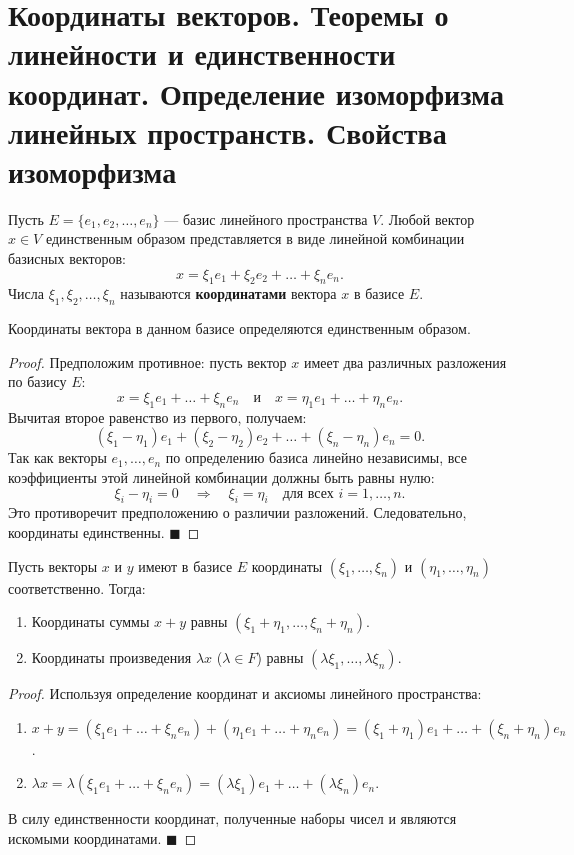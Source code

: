 \section{Координаты векторов. Теоремы о линейности и единственности координат. Определение изоморфизма линейных пространств. Свойства изоморфизма}

\begin{definition}
Пусть $E = \{e_1, e_2, \dots, e_n\}$ --- базис линейного пространства $V$. Любой вектор $x \in V$ единственным образом представляется в виде линейной комбинации базисных векторов:
\[
x = \xi_1 e_1 + \xi_2 e_2 + \dots + \xi_n e_n.
\]
Числа $\xi_1, \xi_2, \dots, \xi_n$ называются \textbf{координатами} вектора $x$ в базисе $E$.
\end{definition}

\begin{theorem}
Координаты вектора в данном базисе определяются единственным образом.
\end{theorem}

\begin{proof}
Предположим противное: пусть вектор $x$ имеет два различных разложения по базису $E$:
\[
x = \xi_1 e_1 + \dots + \xi_n e_n \quad \text{и} \quad x = \eta_1 e_1 + \dots + \eta_n e_n.
\]
Вычитая второе равенство из первого, получаем:
\[
(\xi_1 - \eta_1)e_1 + (\xi_2 - \eta_2)e_2 + \dots + (\xi_n - \eta_n)e_n = 0.
\]
Так как векторы $e_1, \dots, e_n$ по определению базиса линейно независимы, все коэффициенты этой линейной комбинации должны быть равны нулю:
\[
\xi_i - \eta_i = 0 \quad \Rightarrow \quad \xi_i = \eta_i \quad \text{для всех } i = 1, \dots, n.
\]
Это противоречит предположению о различии разложений. Следовательно, координаты единственны.
\hfill$\blacksquare$
\end{proof}

\begin{theorem}
Пусть векторы $x$ и $y$ имеют в базисе $E$ координаты $(\xi_1, \dots, \xi_n)$ и $(\eta_1, \dots, \eta_n)$ соответственно. Тогда:
\begin{enumerate}
    \item Координаты суммы $x + y$ равны $(\xi_1 + \eta_1, \dots, \xi_n + \eta_n)$.
    \item Координаты произведения $\lambda x$ ($\lambda \in F$) равны $(\lambda \xi_1, \dots, \lambda \xi_n)$.
\end{enumerate}
\end{theorem}

\begin{proof}
Используя определение координат и аксиомы линейного пространства:
\begin{enumerate}
    \item $x + y = (\xi_1 e_1 + \dots + \xi_n e_n) + (\eta_1 e_1 + \dots + \eta_n e_n) = (\xi_1 + \eta_1)e_1 + \dots + (\xi_n + \eta_n)e_n$.
    \item $\lambda x = \lambda (\xi_1 e_1 + \dots + \xi_n e_n) = (\lambda \xi_1)e_1 + \dots + (\lambda \xi_n)e_n$.
\end{enumerate}
В силу единственности координат, полученные наборы чисел и являются искомыми координатами.
\hfill$\blacksquare$
\end{proof}

